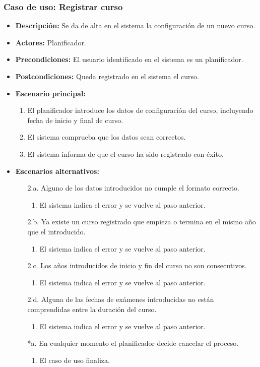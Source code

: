 \subsubsection*{Caso de uso: Registrar curso}
\begin{itemize}
\item{\bf Descripción:} Se da de alta en el sistema la configuración de un nuevo curso.
\item{\bf Actores:} Planificador.
\item{\bf Precondiciones:} El usuario identificado en el sistema es un planificador.
\item{\bf Postcondiciones:} Queda registrado en el sistema el curso.
\item{\bf Escenario principal:}
  \begin{enumerate}
  \item El planificador introduce los datos de configuración del curso, incluyendo fecha de inicio y final de curso.
  \item El sistema comprueba que los datos sean correctos.
  \item El sistema informa de que el curso ha sido registrado con éxito.
  \end{enumerate}
\item{\bf Escenarios alternativos:}
  \begin{itemize}
  \item[2.a.] Alguno de los datos introducidos no cumple el formato correcto.
    \begin{enumerate}
    \item El sistema indica el error y se vuelve al paso anterior.
    \end{enumerate}
  \item[2.b.] Ya existe un curso registrado que empieza o termina en el mismo año que el introducido.
    \begin{enumerate}
    \item El sistema indica el error y se vuelve al paso anterior.
    \end{enumerate}
  \item[2.c.] Los años introducidos de inicio y fin del curso no son consecutivos.
    \begin{enumerate}
    \item El sistema indica el error y se vuelve al paso anterior.
    \end{enumerate}
  \item[2.d.] Alguna de las fechas de exámenes introducidas no están comprendidas entre la duración del curso.
    \begin{enumerate}
    \item El sistema indica el error y se vuelve al paso anterior.
    \end{enumerate}
  \item[*a.] En cualquier momento el planificador decide cancelar el proceso.
    \begin{enumerate}
    \item El caso de uso finaliza.
    \end{enumerate}
  \end{itemize}
\end{itemize}



